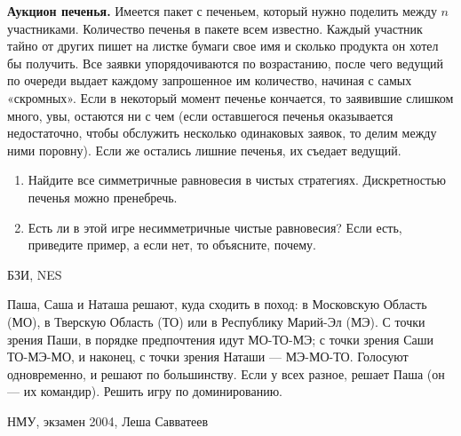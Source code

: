 \begin{problem}
 {\bf Аукцион печенья.} Имеется пакет с печеньем,
который нужно поделить между $n$ участниками. Количество
печенья в пакете всем известно. Каждый участник тайно от
других пишет на листке бумаги свое имя и сколько продукта
он хотел бы получить. Все заявки упорядочиваются по
возрастанию, после чего ведущий по очереди выдает каждому
запрошенное им количество, начиная с самых «скромных».
Если в некоторый момент печенье кончается, то заявившие
слишком много, увы, остаются ни с чем (если оставшегося
печенья оказывается недостаточно, чтобы обслужить несколько
одинаковых заявок, то делим между ними поровну). Если же
остались лишние печенья, их съедает ведущий.

\begin{enumerate}

\item Найдите все симметричные равновесия в чистых
стратегиях. Дискретностью печенья можно пренебречь.

\item Есть ли в этой игре несимметричные чистые равновесия?
Если есть, приведите пример, а если нет, то объясните,
почему.

\end{enumerate}




\begin{source}
БЗИ, NES
\end{source}


\begin{sol}

\end{sol}
\end{problem}





\begin{problem}
Паша, Саша и Наташа решают, куда сходить в поход: в Московскую Область (МО), в Тверскую Область (ТО) или в Республику Марий-Эл (МЭ). С точки зрения Паши, в порядке предпочтения идут МО-ТО-МЭ; с точки зрения Саши ТО-МЭ-МО, и наконец, с точки зрения Наташи — МЭ-МО-ТО. Голосуют одновременно, и решают по большинству. Если у всех разное, решает Паша (он — их командир). Решить игру по доминированию.



\begin{source}
НМУ, экзамен 2004, Леша Савватеев
\end{source}


\begin{sol}

\end{sol}
\end{problem}




